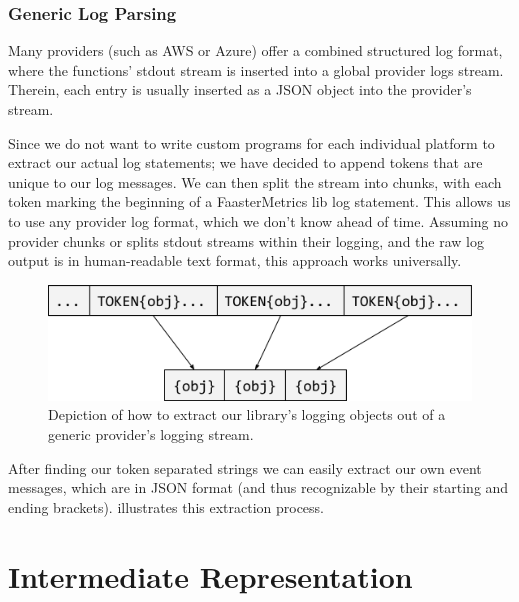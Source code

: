 \documentclass[../main.tex]{subfiles}
\begin{document}
\subsubsection{Generic Log Parsing}%
\label{ssub:analysisGenericParsing}

Many providers (such as AWS or Azure) offer a combined structured log format, 
where the functions' stdout stream is inserted into a global provider logs stream. 
Therein, each entry is usually inserted as a JSON object into the provider's stream. 

Since we do not want to write custom programs for each individual platform to extract our actual log statements; 
we have decided to append tokens that are unique to our log messages. 
We can then split the stream into chunks, with each token marking the beginning of a FaasterMetrics lib log statement.
This allows us to use any provider log format, which we don't know ahead of time. 
Assuming no provider chunks or splits stdout streams within their logging, 
and the raw log output is in human-readable text format, 
this approach works universally. 

\begin{figure}
\begin{center}
  \includegraphics[width=\linewidth, keepaspectratio]{./token-string.png}
\end{center}
\caption[Parsing Log Strings With Tokens]{%
  Depiction of how to extract our library's logging objects out of a generic provider's logging stream.
}
\label{fig:analysisTokenStrings}
\end{figure}

After finding our token separated strings we can easily extract our own event messages, which are in JSON format
(and thus recognizable by their starting and ending brackets).
 illustrates this extraction process.

\section{Intermediate Representation}%
\label{sec:analysisIR}
\end{document}
